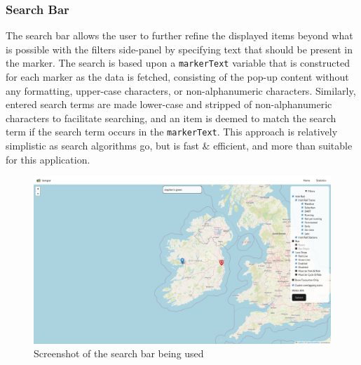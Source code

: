 \documentclass[a4paper,11pt]{report}
\begin{document}
\subsubsection{Search Bar}
The search bar allows the user to further refine the displayed items beyond what is possible with the filters side-panel by specifying text that should be present in the marker.
The search is based upon a \verb|markerText| variable that is constructed for each marker as the data is fetched, consisting of the pop-up content without any formatting, upper-case characters, or non-alphanumeric characters.
Similarly, entered search terms are made lower-case and stripped of non-alphanumeric characters to facilitate searching, and an item is deemed to match the search term if the search term occurs in the \verb|markerText|.
This approach is relatively simplistic as search algorithms go, but is fast \& efficient, and more than suitable for this application.

\begin{figure}[H]
    \centering
    \includegraphics[width=\textwidth]{./images/searchstephens.png}
    \caption{Screenshot of the search bar being used}
\end{figure}
\end{document}

